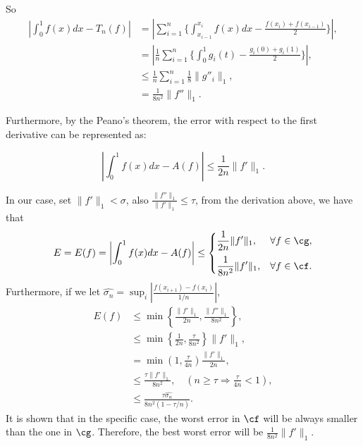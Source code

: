 So
\begin{align*}
  \left|\int_{0}^{1}f(x)dx-T_n(f)\right|&=\left|\sum_{i=1}^{n}\{\int_{x_{i-1}}^{x_i}f(x)dx-\frac{f(x_i)+f(x_{i-1})}{2}\}\right|,\\
  &=\left|\frac{1}{n}\sum_{i=1}^{n}\{\int_{0}^{1}g_i(t)-\frac{g_i(0)+g_i(1)}{2}\}\right|,\\
  &\leq\frac{1}{n}\sum_{i=1}^{n}\frac{1}{8}\|g''_i\|_1,\\
  &=\frac{1}{8n^2}\|f''\|_1.
\end{align*}

Furthermore, by the Peano's theorem, the error with respect to the first derivative can be represented as:

$$\left|\int_{0}^{1}f(x)dx-A(f)\right|\leq\frac{1}{2n}\|f'\|_{1}.$$

In our case, set $\|f'\|_{1}<\sigma$, also $\frac{\|f''\|_{1}}{\|f'\|_{1}}\leq\tau$, from the derivation above, we have that
\begin{align*}
  E=E(f)=\left|\int_{0}^{1}f(x)dx-A(f)\right|\leq\begin{cases} \displaystyle \frac{1}{2n}\|f'\|_1, & \forall f\in\cg,\\[2ex]
 \displaystyle  \frac{1}{8n^2}\|f'\|_1, & \forall f \in \cf.
\end{cases}
\end{align*}
Furthermore, if we let $\hat{\sigma_n}=\sup_i\left|\frac{f(x_{i+1})-f(x_i)}{1/n}\right|$,
\begin{align*}
  E(f) &\leq \min\left\{\frac{\|f'\|_{1}}{2n},\frac{\|f''\|_{1}}{8n^2}\right\},\\
  &\leq \min\left\{\frac{1}{2n},\frac{\tau}{8n^2}\right\}\|f'\|_{1},\\
  &= \min(1,\frac{\tau}{4n})\frac{\|f'\|_{1}}{2n},\\
  &\leq \frac{\tau\|f'\|_{1}}{8n^2}, \quad (n\geq \tau \Rightarrow \frac{\tau}{4n}<1),\\
  &\leq \frac{\tau\hat{\sigma_n}}{8n^2(1-\tau/n)}.
\end{align*}
It is shown that in the specific case, the worst error in $\cf$ will be always smaller than the one in $\cg$. Therefore, the best worst error will be $\frac{1}{8n^2}\|f'\|_1$.

